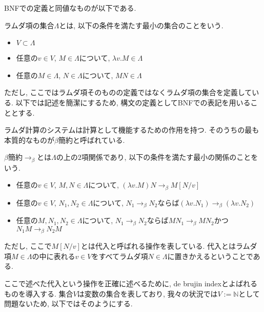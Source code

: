 \documentclass{ltjsarticle}
\begin{document}
BNFでの定義と同値なものが以下である.

\begin{defn}
 ラムダ項の集合$\Lambda$とは, 以下の条件を満たす最小の集合のことをいう.
 \begin{itemize}
  \item $V \subset \Lambda$
  \item 任意の$v \in V$, $M \in \Lambda$について, $\lambda v. M \in \Lambda$
  \item 任意の$M \in \Lambda$, $N \in \Lambda$について, $M N \in \Lambda$
 \end{itemize}
\end{defn}

ただし, ここではラムダ項そのものの定義ではなくラムダ項の集合を定義している. 以下では記述を簡潔にするため, 構文の定義としてBNFでの表記を用いることとする.

ラムダ計算のシステムは計算として機能するための作用を持つ. そのうちの最も本質的なものが$\beta$簡約と呼ばれている.

\begin{defn}
 $\beta$簡約$\rightarrow_{\beta}$とは$\Lambda$の上の$2$項関係であり, 以下の条件を満たす最小の関係のことをいう.
 \begin{itemize}
  \item 任意の$v \in V$, $M, N \in \Lambda$について, $(\lambda v. M) N \rightarrow_\beta M[N/v]$
  \item 任意の$v \in V$, $N_1, N_2 \in \Lambda$について, $N_1 \rightarrow_\beta N_2$ならば$(\lambda v. N_1) \rightarrow_\beta (\lambda v. N_2)$
  \item 任意の$M, N_1, N_2 \in \Lambda$について, $N_1 \rightarrow_\beta N_2$ならば$M N_1 \rightarrow_\beta M N_2$かつ$N_1 M \rightarrow_\beta N_2 M$
 \end{itemize}
 ただし, ここで$M[N/v]$とは代入と呼ばれる操作を表している. 代入とはラムダ項$M \in \Lambda$の中に表れる$v \in V$をすべてラムダ項$N \in \Lambda$に置きかえるということである.
\end{defn}

ここで述べた代入という操作を正確に述べるために, de brujin indexとよばれるものを導入する.
集合$V$は変数の集合を表しており, 我々の状況では$V := \mathbb{N}$として問題ないため, 以下ではそのようにする.
\end{document}
